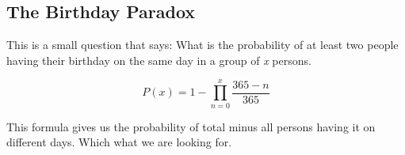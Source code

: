 \subsection{The Birthday Paradox}

This is a small question that says: What is the probability of at least two people having 
their birthday on the same day in a group of \emph{x} persons.

\[
    P(x) = 1 - \prod_{n = 0}^{x} \frac{365 - n}{365}
\]

This formula gives us the probability of total minus all persons having it on different days. Which
what we are looking for.